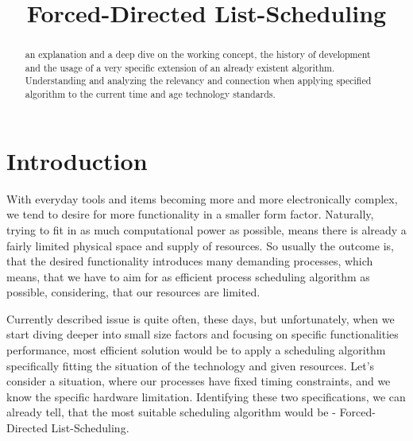 \documentclass[conference]{IEEEtran}
\begin{document}
\title{Forced-Directed List-Scheduling}

\author{
}

\maketitle

\begin{abstract}
an explanation and a deep dive on the working concept, the history of development and the usage of a very specific extension of an already existent algorithm. Understanding and analyzing the relevancy and connection when applying specified algorithm to the current time and age technology standards.
\end{abstract}



\thispagestyle{firstpagefooter}

\section{Introduction}

With everyday tools and items becoming more and more electronically complex, we tend to desire for more functionality in a smaller form factor. Naturally, trying to fit in as much computational power as possible, means there is already a fairly limited physical space and supply of resources. So usually the outcome is, that the desired functionality introduces many demanding processes, which means, that we have to aim for as efficient process scheduling algorithm as possible, considering, that our resources are limited.

Currently described issue is quite often, these days, but unfortunately, when we start diving deeper into small size factors and focusing on specific functionalities performance, most efficient solution would be to apply a scheduling algorithm specifically fitting the situation of the technology and given resources. Let's consider a situation, where our processes have fixed timing constraints, and we know the specific hardware limitation. Identifying these two specifications, we can already tell, that the most suitable scheduling algorithm would be - Forced-Directed List-Scheduling.
\end{document}
